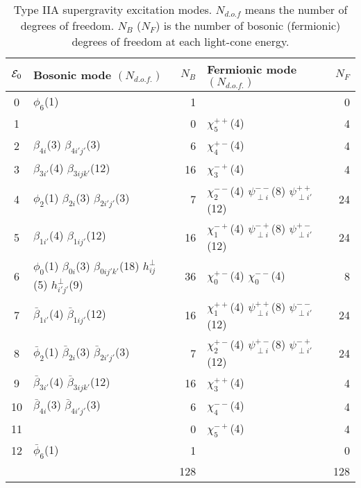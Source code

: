 \documentclass[a4paper,12pt]{article}
\numberwithin{equation}{section}
\begin{document}
\begin{table}
\begin{center}
\begin{tabular}{|c|lr|lr|}
\hline
${\cal E}_0$
    & Bosonic mode $(N_{d.o.f.})$
    & $N_B$
    & Fermionic mode $(N_{d.o.f.})$
    & $N_F$  \\
\hline
0   & $\phi_6$(1)
    & 1
    &
    & 0 \\
1   &
    & 0
    & $\chi^{++}_5$(4)
    & 4 \\
2   & $\beta_{4i}$(3) $\beta_{4i'j'}$(3)
    & 6
    & $\chi^{+-}_4$(4)
    & 4 \\
3   & $\beta_{3i'}$(4) $\beta_{3ijk'}$(12)
    & 16
    & $\chi^{-+}_3$(4)
    & 4 \\
4   & $\phi_2$(1) $\beta_{2i}$(3) $\beta_{2i'j'}$(3)
    & 7
    & $\chi^{--}_2$(4) $\psi^{--}_{\perp i}$(8)
      $\psi^{++}_{\perp i'}$(12)
    & 24 \\
5   & $\beta_{1i'}$(4) $\beta_{1ij'}$(12)
    & 16
    & $\chi^{-+}_1$(4) $\psi^{-+}_{\perp i}$(8)
      $\psi^{+-}_{\perp i'}$(12)
    & 24 \\
6   & $\phi_0$(1) $\beta_{0i}$(3) $\beta_{0ij'k'}$(18)
      $h^\perp_{ij}$(5) $h^\perp_{i'j'}$(9)
    & 36
    & $\chi^{+-}_0$(4) $\chi^{--}_0$(4)
    & 8 \\
7   & $\bar{\beta}_{1i'}$(4) $\bar{\beta}_{1ij'}$(12)
    & 16
    & $\chi^{++}_1$(4) $\psi^{++}_{\perp i}$(8)
      $\psi^{--}_{\perp i'}$(12)
    & 24 \\
8   & $\bar{\phi}_2$(1) $\bar{\beta}_{2i}$(3) $\bar{\beta}_{2i'j'}$(3)
    & 7
    & $\chi^{+-}_2$(4) $\psi^{+-}_{\perp i}$(8)
      $\psi^{-+}_{\perp i'}$(12)
    & 24 \\
9   & $\bar{\beta}_{3i'}$(4) $\bar{\beta}_{3ijk'}$(12)
    & 16
    & $\chi^{++}_3$(4)
    & 4 \\
10  & $\bar{\beta}_{4i}$(3) $\bar{\beta}_{4i'j'}$(3)
    & 6
    & $\chi^{--}_4$(4)
    & 4 \\
11  &
    & 0
    & $\chi^{-+}_5$(4)
    & 4 \\
12  & $\bar{\phi}_6$(1)
    & 1
    &
    & 0 \\
\hline
    &  & 128 &  & 128 \\
\hline
\end{tabular}
\end{center}
\caption{Type IIA supergravity excitation modes.  $N_{d.o.f}$ means
  the number of degrees of freedom.  $N_B$ ($N_F$) is the number of
  bosonic (fermionic) degrees of freedom at each light-cone energy.}
\label{sugra-states}
\end{table}
\end{document}
